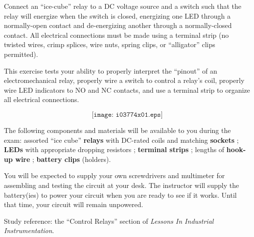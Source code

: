 

Connect an ``ice-cube'' relay to a DC voltage source and a switch such that the relay will energize when the switch is closed, energizing one LED through a normally-open contact and de-energizing another through a normally-closed contact.  All electrical connections must be made using a terminal strip (no twisted wires, crimp splices, wire nuts, spring clips, or ``alligator'' clips permitted).

This exercise tests your ability to properly interpret the ``pinout'' of an electromechanical relay, properly wire a switch to control a relay's coil, properly wire LED indicators to NO and NC contacts, and use a terminal strip to organize all electrical connections.

$$\texttt{[image: i03774x01.eps]}$$

\vskip 10pt

The following components and materials will be available to you during the exam: assorted ``ice cube'' {\bf relays} with DC-rated coils and matching {\bf sockets} ; {\bf LEDs} with appropriate dropping resistors ; {\bf terminal strips} ; lengths of {\bf hook-up wire} ; {\bf battery clips} (holders).

\vskip 10pt

You will be expected to supply your own screwdrivers and multimeter for assembling and testing the circuit at your desk.  The instructor will supply the battery(ies) to power your circuit when you are ready to see if it works.  Until that time, your circuit will remain unpowered.

\vfil

Study reference: the ``Control Relays'' section of {\it Lessons In Industrial Instrumentation}.


















